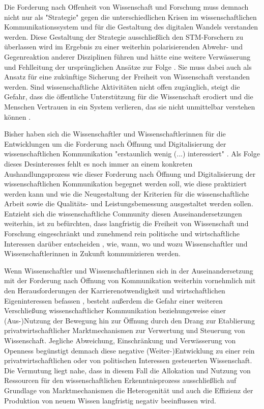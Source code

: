 Die Forderung nach Offenheit von Wissenschaft und Forschung muss demnach nicht nur als "Strategie" gegen die unterschiedlichen Krisen im wissenschaftlichen Kommunikationssystem und für die Gestaltung des digitalen Wandels verstanden werden. Diese Gestaltung der Strategie ausschließlich den STM-Forschern zu überlassen wird im Ergebnis zu einer weiterhin polarisierenden Abwehr- und Gegenreaktion anderer Disziplinen führen und hätte eine weitere Verwässerung und Fehlleitung der ursprünglichen Ansätze zur Folge \cite{Naeder_2010}. Sie muss dabei auch als Ansatz für eine zukünftige Sicherung der Freiheit von Wissenschaft verstanden werden. Sind wissenschaftliche Aktivitäten nicht offen zugänglich, steigt die Gefahr, dass die öffentliche Unterstützung für die Wissenschaft erodiert und die Menschen Vertrauen in ein System verlieren, das sie nicht unmittelbar verstehen können \cite{Resnik_2005}.

Bisher haben sich die Wissenschaftler und Wissenschaftlerinnen für die Entwicklungen um die Forderung nach Öffnung und Digitalisierung der wissenschaftlichen Kommunikation "erstaunlich wenig (...) interessiert" \cite[:67]{Hagner_2015}. Als Folge dieses Desinteresses fehlt es noch immer an einem konkreten Aushandlungsprozess wie dieser Forderung nach Öffnung und Digitalisierung der wissenschaftlichen Kommunikation begegnet werden soll, wie diese praktiziert werden kann und wie die Neugestaltung der Kriterien für die wissenschaftliche Arbeit sowie die Qualitäts- und Leistungsbemessung ausgestaltet werden sollen. Entzieht sich die wissenschaftliche Community diesen Auseinandersetzungen weiterhin, ist zu befürchten, dass langfristig die Freiheit von Wissenschaft und Forschung eingeschränkt und zunehmend rein politische und wirtschaftliche Interessen darüber entscheiden \cite{Warnke_2012}, wie, wann, wo und wozu Wissenschaftler und Wissenschaftlerinnen in Zukunft kommunizieren werden.

Wenn Wissenschaftler und Wissenschaftlerinnen sich in der Auseinandersetzung mit der Forderung nach Öffnung von Kommunikation weiterhin vornehmlich mit den Herausforderungen der Karrierenotwendigkeit und wirtschaftlichen Eigeninteressen befassen \cite{Resnik_2005}, besteht außerdem die Gefahr einer weiteren Verschließung wissenschaftlicher Kommunikation beziehungsweise einer (Aus-)Nutzung der Bewegung hin zur Öffnung durch den Drang zur Etablierung privatwirtschaftlicher Marktmechanismen zur Verwertung und Steuerung von Wissenschaft. Jegliche Abweichung, Einschränkung und Verwässerung von Openness begünstigt demnach diese negative (Weiter-)Entwicklung zu einer rein privatwirtschaftlichen oder von politischen Interessen gesteuerten Wissenschaft. Die Vermutung liegt nahe, dass in diesem Fall die Allokation und Nutzung von Ressourcen für den wissenschaftlichen Erkenntnisprozess ausschließlich auf Grundlage von Marktmechanismen die Heterogenität und auch die Effizienz der Produktion von neuem Wissen langfristig negativ beeinflussen wird.

